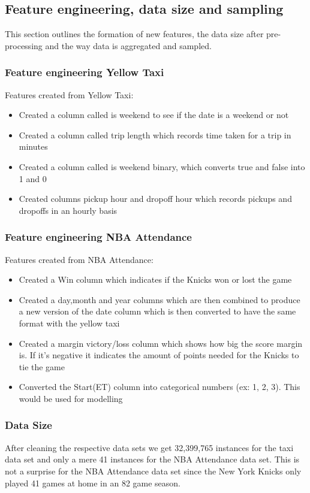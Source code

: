 \documentclass[11pt]{article}
\begin{document}
\subsection{Feature engineering, data size and sampling}
This section outlines the formation of new features, the data size after pre-processing and the way data is aggregated and sampled.

\subsubsection{Feature engineering Yellow Taxi}
Features created from Yellow Taxi:
\begin{itemize}
    \item{Created a column called is weekend to see if the date is a weekend or not}
    \item{Created a column called trip length which records time taken for a trip in minutes}
    \item{Created a column called is weekend binary, which converts true and false into 1 and 0}
    \item{Created columns pickup hour and dropoff hour which records pickups and dropoffs in an hourly basis}
\end{itemize}

\subsubsection{Feature engineering NBA Attendance}
Features created from NBA Attendance:
\begin{itemize}
    \item{Created a Win column which indicates if the Knicks won or lost the game}
    \item{Created a day,month and year columns which are then combined to produce a new version of the date column which is then converted to have the same format with the yellow taxi}
    \item{Created a margin victory/loss column which shows how big the score margin is. If it's negative it indicates the amount of points needed for the Knicks to tie the game}
    \item{Converted the Start(ET) column into categorical numbers (ex: 1, 2, 3). This would be used for modelling}

\end{itemize}

\subsubsection{Data Size}
After cleaning the respective data sets we get 32,399,765 instances for the taxi data set and only a mere 41 instances for the NBA Attendance data set. This is not a surprise for the NBA Attendance data set since the New York Knicks only played 41 games at home in an 82 game season. 
\end{document}
